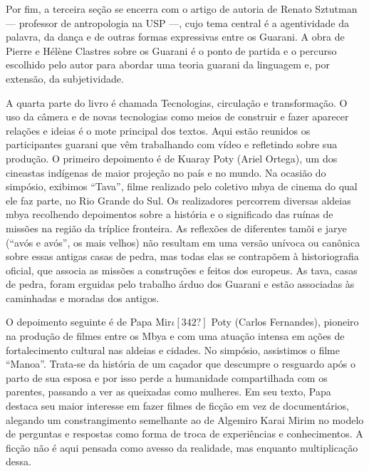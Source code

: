 \documentclass{article}
\begin{document}
Por fim, a terceira se\c{c}\~ao se encerra com o artigo de autoria de
Renato Sztutman --- professor de antropologia na USP ---, cujo tema
central \'e a agentividade da palavra, da dan\c{c}a e de outras formas
expressivas entre os Guarani. A obra de Pierre e H\'el\`ene Clastres
sobre os Guarani \'e o ponto de partida e o percurso escolhido pelo
autor para abordar uma teoria guarani da linguagem e, por extens\~ao,
da subjetividade. 

A quarta parte do livro \'e chamada Tecnologias, circula\c{c}\~ao e
transforma\c{c}\~ao. O uso da c\^amera e de novas tecnologias como
meios de construir e fazer aparecer rela\c{c}\~oes e ideias \'e o mote
principal dos textos. Aqui est\~ao reunidos os participantes guarani
que v\^em trabalhando com v\'ideo e refletindo sobre sua
produ\c{c}\~ao. O primeiro depoimento \'e de Kuaray Poty (Ariel
Ortega), um dos cineastas ind\'igenas de maior proje\c{c}\~ao no pa\'is
e no mundo. Na ocasi\~ao do simp\'osio, exibimos
{\textquotedblleft}Tava{\textquotedblright}, filme realizado pelo
coletivo mbya de cinema do qual ele faz parte, no Rio Grande do Sul. Os
realizadores percorrem diversas aldeias mbya recolhendo depoimentos
sobre a hist\'oria e o significado das ru\'inas de miss\~oes na
regi\~ao da tr\'iplice fronteira. As reflex\~oes de diferentes tam\~oi
e jarye ({\textquotedblleft}av\'os e av\'os{\textquotedblright}, os
mais velhos) n\~ao resultam em uma vers\~ao un\'ivoca ou can\^onica
sobre essas antigas casas de pedra, mas todas elas se contrap\~oem \`a
historiografia oficial, que associa as miss\~oes a constru\c{c}\~oes e
feitos dos europeus. As tava, casas de pedra, foram erguidas pelo
trabalho \'arduo dos Guarani e est\~ao associadas \`as caminhadas e
moradas dos antigos. 

O depoimento seguinte \'e de Papa Mir$\iota [342?]$ Poty (Carlos
Fernandes), pioneiro na produ\c{c}\~ao de filmes entre os Mbya e com
uma atua\c{c}\~ao intensa em a\c{c}\~oes de fortalecimento cultural nas
aldeias e cidades. No simp\'osio, assistimos o filme
{\textquotedblleft}Manoa{\textquotedblright}. Trata-se da hist\'oria de
um ca\c{c}ador que descumpre o resguardo ap\'os o parto de sua esposa e
por isso perde a humanidade compartilhada com os parentes, passando a
ver as queixadas como mulheres. Em seu texto, Papa destaca seu maior
interesse em fazer filmes de fic\c{c}\~ao em vez de document\'arios,
alegando um constrangimento semelhante ao de Algemiro Karai Mirim no
modelo de perguntas e respostas como forma de troca de experi\^encias e
conhecimentos. A fic\c{c}\~ao n\~ao \'e aqui pensada como avesso da
realidade, mas enquanto multiplica\c{c}\~ao dessa. 
\end{document}
